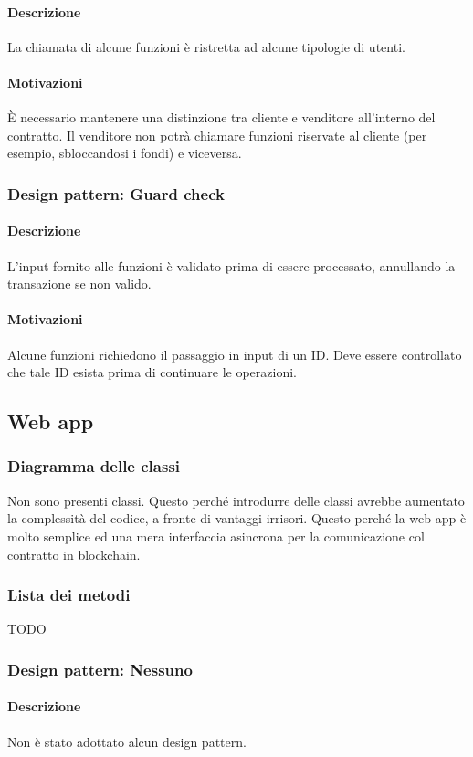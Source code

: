 \documentclass[a4paper, 12pt]{article}
\begin{document}
\paragraph{Descrizione}
La chiamata di alcune funzioni è ristretta ad alcune tipologie di utenti.
\paragraph{Motivazioni}
È necessario mantenere una distinzione tra cliente e venditore all'interno del contratto.
Il venditore non potrà chiamare funzioni riservate al cliente (per esempio, sbloccandosi i fondi) e viceversa.
\subsubsection{Design pattern: Guard check}
\paragraph{Descrizione}
L'input fornito alle funzioni è validato prima di essere processato, annullando la transazione se non valido.
\paragraph{Motivazioni}
Alcune funzioni richiedono il passaggio in input di un ID.
Deve essere controllato che tale ID esista prima di continuare le operazioni.

\subsection{Web app}
\subsubsection{Diagramma delle classi}
Non sono presenti classi. Questo perché introdurre delle classi avrebbe aumentato la complessità del codice, a fronte di vantaggi irrisori. Questo perché la web app è molto semplice ed una mera interfaccia asincrona per la comunicazione col contratto in blockchain.
\subsubsection{Lista dei metodi}
TODO
\subsubsection{Design pattern: Nessuno}
\paragraph{Descrizione}
Non è stato adottato alcun design pattern.
\end{document}
